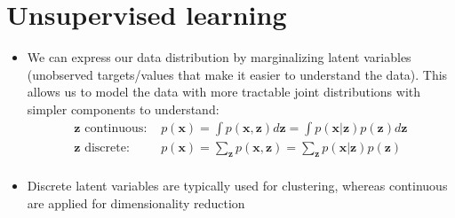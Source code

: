 \section{Unsupervised learning}
\begin{itemize}
	\item We can express our data distribution by marginalizing latent variables (unobserved targets/values that make it easier to understand the data). This allows us to model the data with more tractable joint distributions with simpler components to understand:
	\begin{equation*}
		\begin{split}
			\bm{z}\text{ continuous: } & p\left(\bm{x}\right) = \int p\left(\bm{x}, \bm{z}\right) d\bm{z} = \int p\left(\bm{x}| \bm{z}\right) p\left(\bm{z}\right)d\bm{z}\\
			\bm{z}\text{ discrete: } & p\left(\bm{x}\right) = \sum\limits_{\bm{z}} p\left(\bm{x}, \bm{z}\right) = \sum\limits_{\bm{z}} p\left(\bm{x}| \bm{z}\right) p\left(\bm{z}\right)\\
		\end{split}
	\end{equation*}
	\item Discrete latent variables are typically used for clustering, whereas continuous are applied for dimensionality reduction 
\end{itemize}
